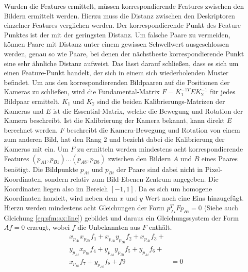 \documentclass[12pt,titlepage, twoside]{article}
\begin{document}
Wurden die Features ermittelt, müssen korrespondierende Features zwischen den Bildern ermittelt werden. 
Hierzu muss die Distanz zwischen den Deskriptoren einzelner Features verglichen werden. 
Der korrespondierende Punkt des Feature-Punktes ist der mit der geringsten Distanz. 
Um falsche Paare zu vermeiden, können Paare mit Distanz unter einem gewissen Schwellwert ausgeschlossen werden, genau so wie 
Paare, bei denen der nächstbeste korrespondierende Punkt eine sehr ähnliche Distanz aufweist. 
Das lässt darauf schließen, dass es sich um einen Feature-Punkt handelt, der sich in einem sich wiederholenden Muster befindet.
Um aus den korrespondierenden Bildpaaren auf die Positionen der Kameras zu schließen, wird die Fundamental-Matrix $F=K_1^{-1T}EK_2^{-1}$ für jedes Bildpaar ermittelt. 
$K_1$ und $K_2$ sind die beiden Kalibrierungs-Matrizen der Kameras und $E$ ist die Essential-Matrix, welche die Bewegung und Rotation der Kamera beschreibt.
Ist die Kalibrierung der Kamera bekannt, kann direkt $E$ berechnet werden.
$F$ beschreibt die Kamera-Bewegung und Rotation von einem zum anderen Bild, hat den Rang $2$ und bezieht dabei die Kalibrierung der Kameras mit ein.
Um $F$ zu ermitteln werden mindestens acht korrespondierende Features $(p_{A1},p_{B1})...(p_{A8},p_{B8})$ zwischen den Bildern $A$ und $B$ eines Paares benötigt. 
Die Bildpunkte $p_{Ai}$ und $p_{Bi}$ der Paare sind dabei nicht in Pixel-Koordinaten, sondern relativ zum Bild-Ebenen-Zentrum angegeben. 
Die Koordinaten liegen also im Bereich  $[-1, 1]$.
Da es sich um homogene Koordinaten handelt, wird neben dem $x$ und $y$ Wert noch eine Eins hinzugefügt.
Hierzu werden mindestens acht Gleichungen der Form $p_{Ai}^TFp_{Bi}=0$ (Siehe auch Gleichung \ref{eq:sfm:ax:line}) gebildet und daraus ein Gleichungssystem der Form $Af=0$ erzeugt, wobei $f$ die Unbekannten aus $F$ enthält.
\begin{equation}
    \label{eq:sfm:ax:line}
    \begin{aligned}
    x_{p_{Ai}}x_{p_{Bi}}f_1 + x_{p_{Ai}}y_{p_{Bi}}f_2 + x_{p_{Ai}}f_3 + &\\
    y_{p_{Ai}}x_{p_{Bi}}f_4 + y_{p_{Ai}}y_{p_{Bi}}f_5 + y_{p_{Ai}}f_6 + &\\
    x_{p_{Bi}}f_7 + y_{p_{Bi}}f_8 + f9 &= 0
    \end{aligned}
\end{equation}
\end{document}
